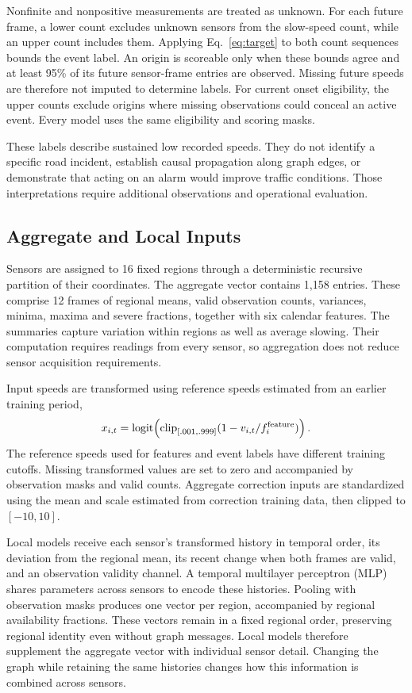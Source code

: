\documentclass{llncs}
\begin{document}
Nonfinite and nonpositive measurements are treated as unknown. For each future frame, a lower count excludes unknown sensors from the slow-speed count, while an upper count includes them. Applying Eq.~\ref{eq:target} to both count sequences bounds the event label. An origin is scoreable only when these bounds agree and at least 95\% of its future sensor-frame entries are observed. Missing future speeds are therefore not imputed to determine labels. For current onset eligibility, the upper counts exclude origins where missing observations could conceal an active event. Every model uses the same eligibility and scoring masks.

These labels describe sustained low recorded speeds. They do not identify a specific road incident, establish causal propagation along graph edges, or demonstrate that acting on an alarm would improve traffic conditions. Those interpretations require additional observations and operational evaluation.





\subsection{Aggregate and Local Inputs}
Sensors are assigned to 16 fixed regions through a deterministic recursive partition of their coordinates. The aggregate vector contains 1,158 entries. These comprise 12 frames of regional means, valid observation counts, variances, minima, maxima and severe fractions, together with six calendar features. The summaries capture variation within regions as well as average slowing. Their computation requires readings from every sensor, so aggregation does not reduce sensor acquisition requirements.

Input speeds are transformed using reference speeds estimated from an earlier training period,
\begin{equation}
 x_{i,t}=\operatorname{logit}\!\left(\operatorname{clip}_{[.001,\allowbreak .999]}(1-v_{i,t}/f_i^{\rm feature})\right).
\end{equation}
The reference speeds used for features and event labels have different training cutoffs. Missing transformed values are set to zero and accompanied by observation masks and valid counts. Aggregate correction inputs are standardized using the mean and scale estimated from correction training data, then clipped to $[-10,10]$.

Local models receive each sensor's transformed history in temporal order, its deviation from the regional mean, its recent change when both frames are valid, and an observation validity channel. A temporal multilayer perceptron (MLP) shares parameters across sensors to encode these histories. Pooling with observation masks produces one vector per region, accompanied by regional availability fractions. These vectors remain in a fixed regional order, preserving regional identity even without graph messages. Local models therefore supplement the aggregate vector with individual sensor detail. Changing the graph while retaining the same histories changes how this information is combined across sensors.
\end{document}
